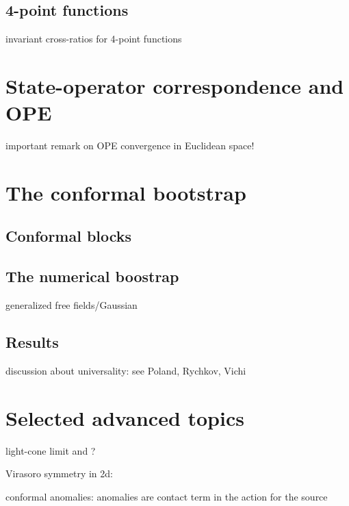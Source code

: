 \documentclass[a4paper,12pt]{article}
\numberwithin{equation}{section}
\begin{document}
\subsection{4-point functions}

invariant cross-ratios for 4-point functions


\section{State-operator correspondence and OPE}

important remark on OPE convergence in Euclidean space!


\section{The conformal bootstrap}

\subsection{Conformal blocks}

\subsection{The numerical boostrap}

generalized free fields/Gaussian

\subsection{Results}


discussion about universality: see Poland, Rychkov, Vichi


\section{Selected advanced topics}

light-cone limit and ?

Virasoro symmetry in 2d:


conformal anomalies: anomalies are contact term in the action for the source
\end{document}
